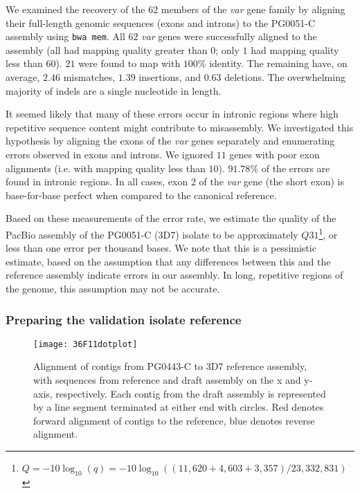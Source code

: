 We examined the recovery of the $62$ members of the \textit{var} gene family by aligning their full-length genomic sequences (exons and introns) to the PG0051-C assembly using \texttt{bwa mem}. All $62$ \textit{var} genes were successfully aligned to the assembly (all had mapping quality greater than $0$; only $1$ had mapping quality less than 60).  $21$ were found to map with $100\%$ identity. The remaining have, on average, $2.46$ mismatches, $1.39$ insertions, and $0.63$ deletions. The overwhelming majority of indels are a single nucleotide in length.

It seemed likely that many of these errors occur in intronic regions where high repetitive sequence content might contribute to misassembly. We investigated this hypothesis by aligning the exons of the \textit{var} genes separately and enumerating errors observed in exons and introns. We ignored $11$ genes with poor exon alignments (i.e. with mapping quality less than $10$). $91.78\%$ of the errors are found in intronic regions. In all cases, exon $2$ of the \textit{var} gene (the short exon) is base-for-base perfect when compared to the canonical reference.

Based on these measurements of the error rate, we estimate the quality of the PacBio assembly of the PG0051-C (3D7) isolate to be approximately $Q31$\footnote{$Q = -10{\log}_{10}(q) = -10{\log}_{10}((11,620 + 4,603 + 3,357)/23,332,831)$}, or less than one error per thousand bases.  We note that this is a pessimistic estimate, based on the assumption that any differences between this and the reference assembly indicate errors in our assembly.  In long, repetitive regions of the genome, this assumption may not be accurate.

\subsubsection{Preparing the validation isolate reference}

\begin{figure}[h!]
  \centering
    \texttt{[image: 36F11dotplot]}
  \caption{Alignment of contigs from PG0443-C to 3D7 reference assembly, with sequences from reference and draft assembly on the x and y-axis, respectively.  Each contig from the draft assembly is represented by a line segment terminated at either end with circles.  Red denotes forward alignment of contigs to the reference, blue denotes reverse alignment.}
  \label{fig:valdotplot}
\end{figure}

